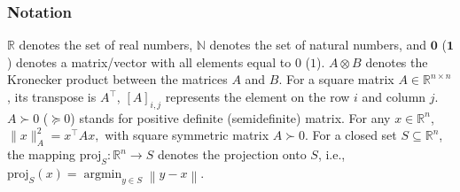 \documentclass{IEEEtran}  %
\newcommand{\bs}{\boldsymbol}
\newcommand{\mc}{\mathcal}
\newcommand{\bb}{\mathbb}
\newcommand{\R}{\bb R}
\newcommand{\argmin}{\operatorname{argmin}}
\newcommand{\fix}{\mathrm{fix}}
\newcommand{\proj}{\mathrm{proj}}
\newcommand{\Id}{\mathrm{Id}}
\newcommand{\col}{\operatorname{col}}
\newcommand{\zer}{\operatorname{zer}}
\newcommand{\nc}{\mathrm{N}}
\newcommand{\0}{\mathbf{0}}
\newcommand{\1}{\mathbf{1}}
\begin{document}
\subsubsection*{Notation}
$\R$ denotes the set of real numbers, $\bb N$ denotes the set of natural numbers, and  $\bs{0}$ ($\bs{1}$) denotes a matrix/vector with all elements equal to $0$ ($1$).
$A \otimes B$ denotes the Kronecker product between the matrices $A$ and $B$. For a square matrix $A \in \R^{n \times n}$, its transpose is $A^\top$, $[A]_{i,j}$ represents the element on the row $i$ and column $j$. $A \succ 0$ ($\succcurlyeq 0$) stands for positive definite (semidefinite) matrix.
{For any $x \in \bb R^n$, $\|x\|_A^2 = x^\top A x,$ with square symmetric matrix $A \succ 0$}. 
For a closed set $S \subseteq \R^n$, the mapping $\proj_{S}:\R^n \rightarrow S$ denotes the projection onto $S$, i.e., $\proj_{S}(x) = \argmin_{y \in S} \left\| y - x\right\|$. 

\end{document}
